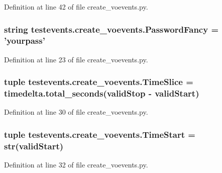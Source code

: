 Definition at line 42 of file create\-\_\-voevents.\-py.

\hypertarget{namespacetestevents_1_1create__voevents_a2db4ec9f725eb156b3fa3d86e0a10ba0}{
\subsubsection[{Password\-Fancy}]{\setlength{\rightskip}{0pt plus 5cm}string testevents.\-create\-\_\-voevents.\-Password\-Fancy = 'yourpass'}}\label{namespacetestevents_1_1create__voevents_a2db4ec9f725eb156b3fa3d86e0a10ba0}


Definition at line 23 of file create\-\_\-voevents.\-py.

\hypertarget{namespacetestevents_1_1create__voevents_aa05646e11a377bb3c5550b25e37ed4fa}{
\subsubsection[{Time\-Slice}]{\setlength{\rightskip}{0pt plus 5cm}tuple testevents.\-create\-\_\-voevents.\-Time\-Slice = timedelta.\-total\-\_\-seconds({\bf valid\-Stop} -\/ {\bf valid\-Start})}}\label{namespacetestevents_1_1create__voevents_aa05646e11a377bb3c5550b25e37ed4fa}


Definition at line 30 of file create\-\_\-voevents.\-py.

\hypertarget{namespacetestevents_1_1create__voevents_abd84c25fbf80dd061bed62068efa42b7}{
\subsubsection[{Time\-Start}]{\setlength{\rightskip}{0pt plus 5cm}tuple testevents.\-create\-\_\-voevents.\-Time\-Start = str({\bf valid\-Start})}}\label{namespacetestevents_1_1create__voevents_abd84c25fbf80dd061bed62068efa42b7}


Definition at line 32 of file create\-\_\-voevents.\-py.

